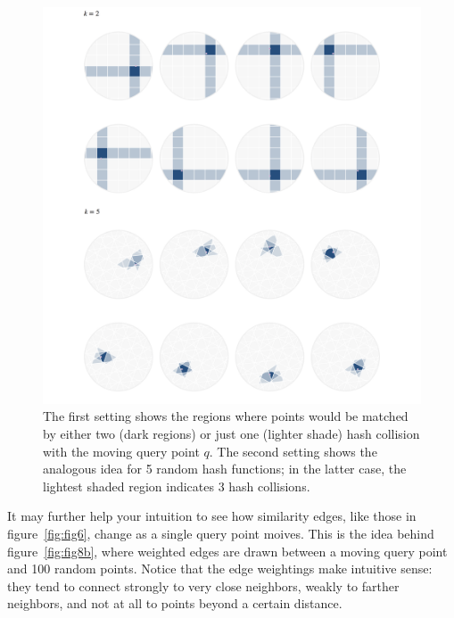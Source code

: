 \documentclass[20pt,]{extarticle}
\begin{document}
\begin{figure}
\centering
\includegraphics{images/image8a_fixed.png}
\caption{The first setting shows the regions where points would be
matched by either two (dark regions) or just one (lighter shade) hash
collision with the moving query point \(q\). The second setting shows
the analogous idea for 5 random hash functions; in the latter case, the
lightest shaded region indicates 3 hash collisions.}\label{fig:fig8a}
\end{figure}

It may further help your intuition to see how similarity edges, like
those in figure~\ref{fig:fig6}, change as a single query point moives.
This is the idea behind figure~\ref{fig:fig8b}, where weighted edges are
drawn between a moving query point and 100 random points. Notice that
the edge weightings make intuitive sense: they tend to connect strongly
to very close neighbors, weakly to farther neighbors, and not at all to
points beyond a certain distance.
\end{document}

